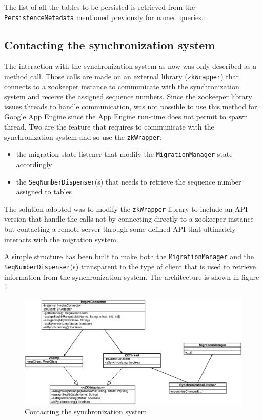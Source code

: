 \noindent The list of all the tables to be persisted is retrieved from the \texttt{PersistenceMetadata} mentioned previously for named queries.
 
\subsection{Contacting the synchronization system}
The interaction with the synchronization system as now was only described as a method call. Those calls are made on an external library (\texttt{zkWrapper}) that connects to a zookeeper instance to communicate with the synchronization system and receive the assigned sequence numbers.
Since the zookeeper library issues threads to handle communication, was not possible to use this method for Google App Engine since the App Engine run-time does not permit to spawn thread.
Two are the feature that requires to communicate with the synchronization system and so use the \texttt{zkWrapper}:
\begin{itemize}
\item the migration state listener that modify the \texttt{MigrationManager} state accordingly
\item the \texttt{SeqNumberDispenser}(s) that needs to retrieve the sequence number assigned to tables
\end{itemize} 
\noindent The solution adopted was to modify the \texttt{zkWrapper} library to include an API version that handle the calls not by connecting directly to a zookeeper instance but contacting a remote server through some defined API that ultimately interacts with the migration system.

\newparagraph A simple structure has been built to make both the \texttt{MigrationManager} and the \texttt{SeqNumberDispenser}(s) transparent to the type of client that is used to retrieve information from the synchronization system. The architecture is shown in figure \ref{fig:zk-adapter}

\begin{figure}[tbh]
  \centering
  \includegraphics[width=14cm]{images/zk_adapter}
  \caption{Contacting the synchronization system}
  \label{fig:zk-adapter}
\end{figure} 

